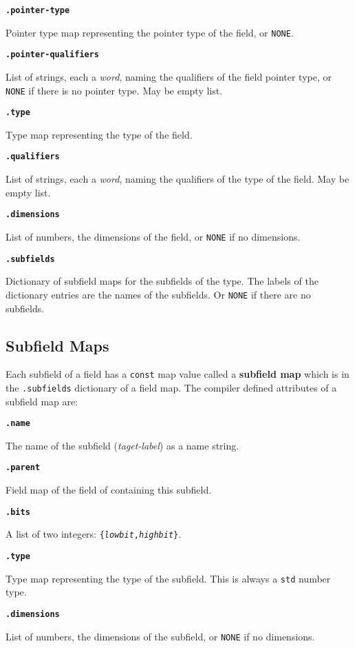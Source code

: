 \documentclass[12pt]{article}
\newcommand{\key}[1]{{\rm \bfseries #1}}
\newcommand{\ttkey}[1]{{\tt \bfseries #1}}
\newenvironment{indpar}[1][0.3in]%
	{\begin{list}{}%
		     {\setlength{\itemsep}{0in}%
		      \setlength{\topsep}{0in}%
		      \setlength{\parsep}{1ex}%
		      \setlength{\labelwidth}{#1}%
		      \setlength{\leftmargin}{#1}%
		      \addtolength{\leftmargin}{\labelsep}}%
	 \item}%
	{\end{list}}
\begin{document}
\ttkey{.pointer-type}
\begin{indpar}
Pointer type map representing the pointer type of the field,
or {\tt NONE}.
\end{indpar}

\ttkey{.pointer-qualifiers}
\begin{indpar}
List of strings, each a {\em word}, naming the qualifiers
of the field pointer type, or {\tt NONE} if there is no
pointer type.  May be empty list.
\end{indpar}

\ttkey{.type}
\begin{indpar}
Type map representing the type of the field.
\end{indpar}

\ttkey{.qualifiers}
\begin{indpar}
List of strings, each a {\em word}, naming the qualifiers
of the type of the field.  May be empty list.
\end{indpar}

\ttkey{.dimensions}
\begin{indpar}
List of numbers, the dimensions of the field, or {\tt NONE}
if no dimensions.
\end{indpar}

\ttkey{.subfields}
\begin{indpar}
Dictionary of subfield maps for the subfields of the type.  The labels
of the dictionary entries are the names of the subfields.
Or {\tt NONE} if there are no subfields.
\end{indpar}

\subsection{Subfield Maps}
\label{SUBFIELD-MAPS}

Each subfield of a field has a {\tt const} map value called
a \key{subfield map} which is in the {\tt .subfields} dictionary of
a field map.  The compiler defined attributes of a subfield map are:

\ttkey{.name}
\begin{indpar}
The name of the subfield ({\em taget-label})
as a name string.
\end{indpar}

\ttkey{.parent}
\begin{indpar}
Field map of the field of containing this subfield.
\end{indpar}

\ttkey{.bits}
\begin{indpar}
A list of two integers: {\tt \{{\rm \em lowbit},{\rm \em highbit}\}}.
\end{indpar}

\ttkey{.type}
\begin{indpar}
Type map representing the type of the subfield.
This is always a {\tt std} number type.
\end{indpar}

\ttkey{.dimensions}
\begin{indpar}
List of numbers, the dimensions of the subfield, or {\tt NONE}
if no dimensions.
\end{indpar}
\end{document}
